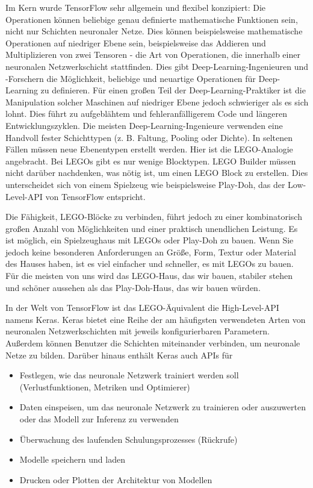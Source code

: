 Im Kern wurde TensorFlow sehr allgemein und flexibel konzipiert: Die Operationen können beliebige genau definierte mathematische Funktionen sein, nicht nur Schichten neuronaler Netze. Dies können beispielsweise mathematische Operationen auf niedriger Ebene sein, beispielsweise das Addieren und Multiplizieren von zwei Tensoren - die Art von Operationen, die innerhalb einer neuronalen Netzwerkschicht stattfinden. Dies gibt Deep-Learning-Ingenieuren und -Forschern die Möglichkeit, beliebige und neuartige Operationen für Deep-Learning zu definieren. Für einen großen Teil der Deep-Learning-Praktiker ist die Manipulation solcher Maschinen auf niedriger Ebene jedoch schwieriger als es sich lohnt. Dies führt zu aufgeblähtem und fehleranfälligerem Code und längeren Entwicklungszyklen. Die meisten Deep-Learning-Ingenieure verwenden eine Handvoll fester Schichttypen (z. B. Faltung, Pooling oder Dichte). In seltenen Fällen müssen neue Ebenentypen erstellt werden. Hier ist die LEGO-Analogie angebracht. Bei LEGOs gibt es nur wenige Blocktypen. LEGO Builder müssen nicht darüber nachdenken, was nötig ist, um einen LEGO Block zu erstellen. Dies unterscheidet sich von einem Spielzeug wie beispielsweise Play-Doh, das der Low-Level-API von TensorFlow entspricht.

Die Fähigkeit, LEGO-Blöcke zu verbinden, führt jedoch zu einer kombinatorisch großen Anzahl von Möglichkeiten und einer praktisch unendlichen Leistung. Es ist möglich, ein Spielzeughaus mit LEGOs oder Play-Doh zu bauen. Wenn Sie jedoch keine besonderen Anforderungen an Größe, Form, Textur oder Material des Hauses haben, ist es viel einfacher und schneller, es mit LEGOs zu bauen. Für die meisten von uns wird das LEGO-Haus, das wir bauen, stabiler stehen und schöner aussehen als das Play-Doh-Haus, das wir bauen würden.

In der Welt von TensorFlow ist das LEGO-Äquivalent die High-Level-API namens Keras.  Keras bietet eine Reihe der am häufigsten verwendeten Arten von neuronalen Netzwerkschichten mit jeweils konfigurierbaren Parametern. Außerdem können Benutzer die Schichten miteinander verbinden, um neuronale Netze zu bilden. Darüber hinaus enthält Keras auch APIs für

\begin{itemize}
     \item Festlegen, wie das neuronale Netzwerk trainiert werden soll (Verlustfunktionen, Metriken und Optimierer)
     \item Daten einspeisen, um das neuronale Netzwerk zu trainieren oder auszuwerten oder das Modell zur Inferenz zu verwenden
     \item Überwachung des laufenden Schulungsprozesses (Rückrufe)
     \item Modelle speichern und laden
     \item Drucken oder Plotten der Architektur von Modellen
 \end{itemize}



